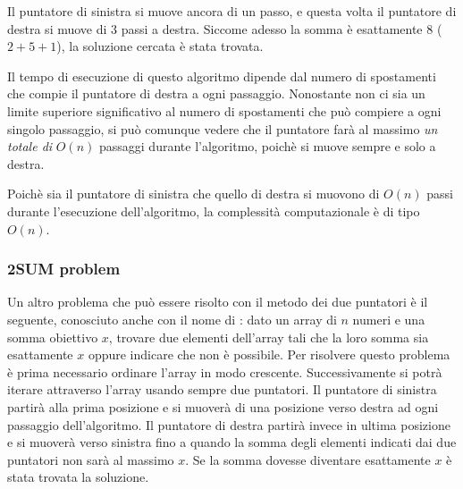 Il puntatore di sinistra si muove ancora di un passo, 
e questa volta il puntatore di destra si muove di 3 passi
a destra.
Siccome adesso la somma è esattamente 8 ($2+5+1$),
la soluzione cercata è stata trovata.

\begin{center}
\end{center}

Il tempo di esecuzione di questo algoritmo dipende
dal numero di spostamenti che compie il puntatore
di destra a ogni passaggio.
Nonostante non ci sia un limite superiore significativo 
al numero di spostamenti che può compiere a ogni singolo
passaggio, si può comunque vedere che il puntatore farà al 
massimo \emph{un totale di }
$O(n)$ passaggi durante l'algoritmo,
poichè si muove sempre e solo a destra.

Poichè sia il puntatore di sinistra che quello di destra
si muovono di $O(n)$ passi durante l'esecuzione dell'algoritmo,
la complessità computazionale è di tipo $O(n)$.

\subsubsection{2SUM problem}


Un altro problema che può essere risolto con 
il metodo dei due puntatori è il seguente, 
conosciuto anche con il nome di  :
dato un array di $n$ numeri e una somma obiettivo $x$,
trovare due elementi dell'array tali che la loro
somma sia esattamente $x$ oppure indicare
che non è possibile.
Per risolvere questo problema è prima
necessario ordinare l'array in modo crescente.
Successivamente si potrà iterare attraverso l'array
usando sempre due puntatori.
Il puntatore di sinistra partirà alla prima posizione
e si muoverà di una posizione verso destra ad ogni
passaggio dell'algoritmo.
Il puntatore di destra partirà invece in ultima posizione
e si muoverà verso sinistra fino a quando la somma degli 
elementi indicati dai due puntatori non
sarà al massimo $x$.
Se la somma dovesse diventare esattamente $x$
è stata trovata la soluzione.

